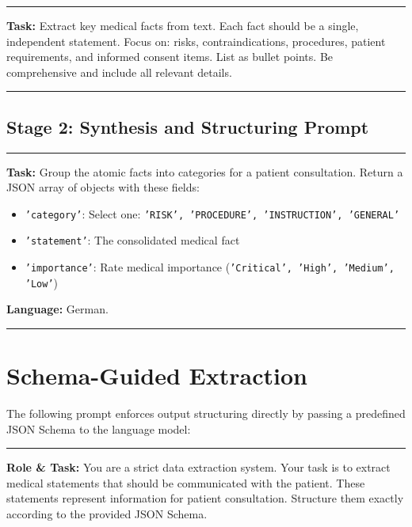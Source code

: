 \vspace{0.5em}
\hrule
\vspace{0.5em}

\textbf{Task:} Extract key medical facts from text. Each fact should be a single, independent statement. Focus on: risks, contraindications, procedures, patient requirements, and informed consent items. List as bullet points. Be comprehensive and include all relevant details.

\vspace{0.5em}
\hrule
\vspace{0.5em}


\subsection*{Stage 2: Synthesis and Structuring Prompt}

\vspace{0.5em}
\hrule
\vspace{0.5em}

\textbf{Task:} Group the atomic facts into categories for a patient consultation. Return a JSON array of objects with these fields:
\begin{itemize}
    \item \texttt{'category'}: Select one: \texttt{'RISK', 'PROCEDURE', 'INSTRUCTION', 'GENERAL'}
    \item \texttt{'statement'}: The consolidated medical fact
    \item \texttt{'importance'}: Rate medical importance (\texttt{'Critical', 'High', 'Medium', 'Low'})
\end{itemize}
\textbf{Language:} German.

\vspace{0.5em}
\hrule
\vspace{0.5em}


\section{Schema-Guided Extraction}
\label{app:schema_extraction_prompt}

The following prompt enforces output structuring directly by passing a predefined JSON Schema to the language model:

\vspace{0.5em}
\hrule
\vspace{0.5em}

\textbf{Role \& Task:} You are a strict data extraction system. Your task is to extract medical statements that should be communicated with the patient. These statements represent information for patient consultation. Structure them exactly according to the provided JSON Schema.

